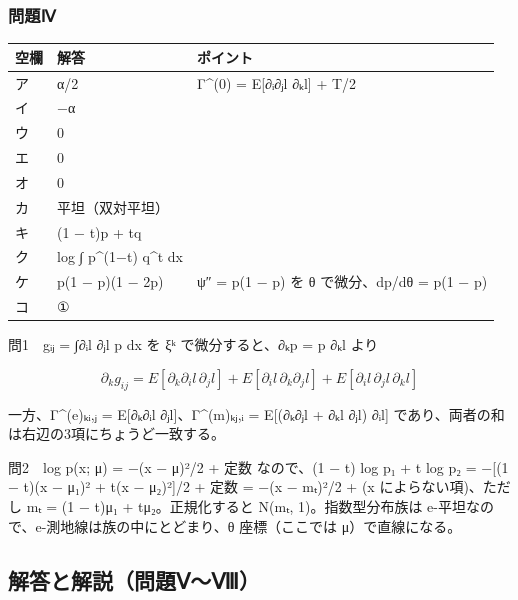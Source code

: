 \documentclass[
  10pt,
  a4paper,
]{article}
\begin{document}
\hypertarget{ux554fux984cux2173}{%
\subsubsection{問題Ⅳ}\label{ux554fux984cux2173}}

\begin{longtable}[]{@{}lll@{}}
\toprule\noalign{}
空欄 & 解答 & ポイント \\
\midrule\noalign{}
\endhead
\bottomrule\noalign{}
\endlastfoot
ア & α/2 & Γ\^{}(0) = E{[}∂{\fallbackfont ᵢ}∂{\fallbackfont ⱼ}l
∂{\fallbackfont ₖ}l{]} + T/2 \\
イ & −α & \\
ウ & 0 & \\
エ & 0 & \\
オ & 0 & \\
カ & 平坦（双対平坦） & \\
キ & (1 − t)p + tq & \\
ク & log ∫ p\^{}(1−t) q\^{}t dx & \\
ケ & p(1 − p)(1 − 2p) & ψ″ = p(1 − p) を θ で微分、dp/dθ = p(1 − p) \\
コ & ① & \\
\end{longtable}

問1　g{\fallbackfont ᵢⱼ} = ∫∂{\fallbackfont ᵢ}l ∂{\fallbackfont ⱼ}l p dx
を ξ{\fallbackfont ᵏ} で微分すると、∂{\fallbackfont ₖ}p = p
∂{\fallbackfont ₖ}l より

\[\partial_k g_{ij} = E[\partial_k\partial_i l\, \partial_j l] + E[\partial_i l\, \partial_k\partial_j l] + E[\partial_i l\, \partial_j l\, \partial_k l]\]

一方、Γ\^{}(e){\fallbackfont ₖᵢ},{\fallbackfont ⱼ} =
E{[}∂{\fallbackfont ₖ}∂{\fallbackfont ᵢ}l
∂{\fallbackfont ⱼ}l{]}、Γ\^{}(m){\fallbackfont ₖⱼ},{\fallbackfont ᵢ} =
E{[}(∂{\fallbackfont ₖ}∂{\fallbackfont ⱼ}l + ∂{\fallbackfont ₖ}l
∂{\fallbackfont ⱼ}l) ∂{\fallbackfont ᵢ}l{]}
であり、両者の和は右辺の3項にちょうど一致する。

問2　log p(x; μ) = −(x − μ)²/2 + 定数 なので、(1 − t) log
p{\fallbackfont ₁} + t log p{\fallbackfont ₂} = −{[}(1 − t)(x −
μ{\fallbackfont ₁})² + t(x − μ{\fallbackfont ₂})²{]}/2 + 定数 = −(x −
m{\fallbackfont ₜ})²/2 + (x によらない項)、ただし m{\fallbackfont ₜ} =
(1 − t)μ{\fallbackfont ₁} + tμ{\fallbackfont ₂}。正規化すると
N(m{\fallbackfont ₜ}, 1)。指数型分布族は
e-平坦なので、e-測地線は族の中にとどまり、θ 座標（ここでは
μ）で直線になる。

\hypertarget{ux89e3ux7b54ux3068ux89e3ux8aacux554fux984cux2174ux2177}{%
\subsection{解答と解説（問題Ⅴ〜Ⅷ）}\label{ux89e3ux7b54ux3068ux89e3ux8aacux554fux984cux2174ux2177}}
\end{document}
